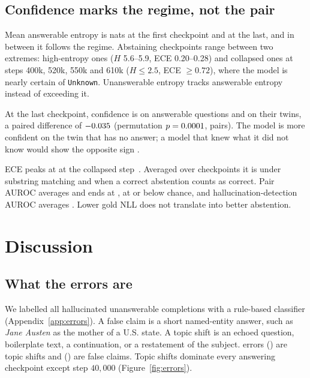 \documentclass[11pt]{article}
\begin{document}
\subsection{Confidence marks the regime, not the pair}

Mean answerable entropy is \resEntropyFirst{} nats at the first checkpoint and \resEntropyLast{} at the last, and in between it follows the regime. Abstaining checkpoints range between two extremes: high-entropy ones ($H$ 5.6--5.9, ECE 0.20--0.28) and collapsed ones at steps 400k, 520k, 550k and 610k ($H\le 2.5$, ECE $\ge 0.72$), where the model is nearly certain of \texttt{Unknown}. Unanswerable entropy tracks answerable entropy instead of exceeding it.

At the last checkpoint, confidence is \resConfAnsLast{} on answerable questions and \resConfUnLast{} on their twins, a paired difference of $-0.035{}$ (permutation $p=0.0001{}$, \resNumAnswerable{} pairs). The model is more confident on the twin that has no answer; a model that knew what it did not know would show the opposite sign \citep{kadavath2022know,yin2023unknown}.

ECE peaks at \resECEMax{} at the collapsed step~\resECEMaxStep{}. Averaged over checkpoints it is \resECESubMean{} under substring matching and \resECEJointMean{} when a correct abstention counts as correct. Pair AUROC averages \resAUROCPairMean{} and ends at \resAUROCPairLast{}, at or below chance, and hallucination-detection AUROC averages \resAUROCDetectMean{}. Lower gold NLL does not translate into better abstention.

\section{Discussion}

\subsection{What the errors are}
\label{sec:errors}

We labelled all \resErrorNHallucinated{} hallucinated unanswerable completions with a rule-based classifier (Appendix~\ref{app:errors}). A false claim is a short named-entity answer, such as \emph{Jane Austen} as the mother of a U.S. state. A topic shift is an echoed question, boilerplate text, a continuation, or a restatement of the subject. \resErrorNTopicShift{} errors (\resErrorTopicShiftShare{}) are topic shifts and \resErrorNFalseClaim{} (\resErrorFalseClaimShare{}) are false claims. Topic shifts dominate every answering checkpoint except step $40{,}000$ (Figure~\ref{fig:errors}).
\end{document}

